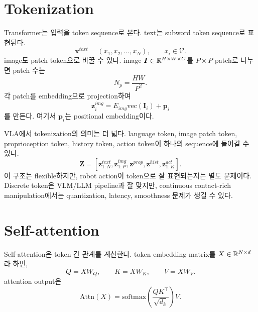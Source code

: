\section{Tokenization}

Transformer는 입력을 token sequence로 본다. text는 subword token sequence로 표현된다.
\begin{equation}
  \bm{x}^{text}
  =
  (x_1,x_2,\ldots,x_N),
  \qquad
  x_i\in\mathcal{V}.
  \label{eq:text-token-sequence}
\end{equation}
image도 patch token으로 바꿀 수 있다. image $\bm{I}\in\mathbb{R}^{H\times W\times C}$를 $P\times P$ patch로 나누면 patch 수는
\begin{equation}
  N_p = \frac{HW}{P^2}.
  \label{eq:number-image-patches}
\end{equation}
각 patch를 embedding으로 projection하여
\begin{equation}
  \bm{z}^{img}_i
  =
  E_{img}\mathrm{vec}(\bm{I}_i)+\bm{p}_i
  \label{eq:vit-patch-embedding}
\end{equation}
를 만든다. 여기서 $\bm{p}_i$는 positional embedding이다.

VLA에서 tokenization의 의미는 더 넓다. language token, image patch token, proprioception token, history token, action token이 하나의 sequence에 들어갈 수 있다.
\begin{equation}
  \bm{Z}
  =
  [\bm{z}^{text}_{1:N},\bm{z}^{img}_{1:P},\bm{z}^{prop},\bm{z}^{hist},\bm{z}^{act}_{1:K}].
  \label{eq:vla-token-sequence}
\end{equation}
이 구조는 flexible하지만, robot action이 token으로 잘 표현되는지는 별도 문제이다. Discrete token은 VLM/LLM pipeline과 잘 맞지만, continuous contact-rich manipulation에서는 quantization, latency, smoothness 문제가 생길 수 있다.

\section{Self-attention}

Self-attention은 token 간 관계를 계산한다. token embedding matrix를 $X\in\mathbb{R}^{N\times d}$라 하면,
\begin{equation}
  Q=XW_Q,\qquad K=XW_K,\qquad V=XW_V.
  \label{eq:qkv}
\end{equation}
attention output은
\begin{equation}
  \mathrm{Attn}(X)
  =
  \mathrm{softmax}\left(\frac{QK^\top}{\sqrt{d_k}}\right)V.
  \label{eq:self-attention}
\end{equation}

